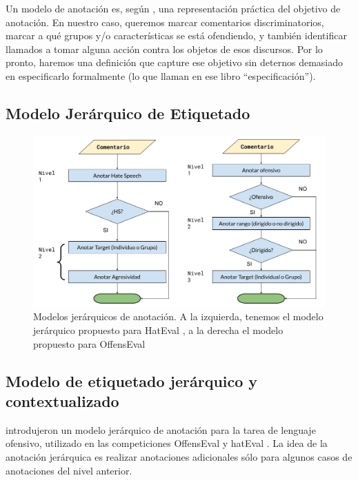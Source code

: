 Un modelo de anotación es, según \citet{pustejovsky2012natural}, una representación práctica del objetivo de anotación. En nuestro caso, queremos marcar comentarios discriminatorios, marcar a qué grupos y/o características se está ofendiendo, y también identificar llamados a tomar alguna acción contra los objetos de esos discursos. Por lo pronto, haremos una definición que capture ese objetivo sin deternos demasiado en especificarlo formalmente (lo que llaman en ese libro ``especificación'').

\subsection{Modelo Jerárquico de Etiquetado}



\begin{figure}
    \centering
    \includegraphics[width=\textwidth]{img/modelosjerarquicos.png}
    \caption{Modelos jerárquicos de anotación. A la izquierda, tenemos el modelo jerárquico propuesto para HatEval \cite{hateval2019semeval}, a la derecha el modelo propuesto para OffensEval \cite{zampieri2019semeval2019}}
    \label{fig:modelos_offenseval_hateval}
\end{figure}

\subsection{Modelo de etiquetado jerárquico y contextualizado}

\citet{zampieri2019predicting} introdujeron un modelo jerárquico de anotación para la tarea de lenguaje ofensivo, utilizado en las competiciones OffensEval \cite{zampieri2019semeval2019} y hatEval \cite{hateval2019semeval}. La idea de la anotación jerárquica es realizar anotaciones adicionales sólo para algunos casos de anotaciones del nivel anterior.

